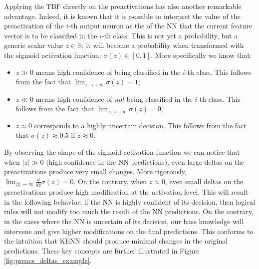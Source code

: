 Applying the TBF directly on the preactivations has also another remarkable advantage. Indeed, it is known that it is  possible to interpret the value of the preactivation of the $i$-th output neuron as the  of the NN that the current feature vector is to be classified in the $i$-th class. This  is not yet a probability, but a generic scalar value $z \in \mathbb{R}$; it will become a probability when transformed with the sigmoid activation function: $\sigma(z) \in \left[0,1\right]$. More specifically we know that:
\begin{itemize}
	\item $z \gg 0$ means high confidence of being classified in the $i$-th class. This follows from the fact that $\lim_{z\rightarrow +\infty} \sigma(z) = 1$;
	\item $z \ll 0$ means high confidence of \textit{not} being classified in the $i$-th class. This follows from the fact that $\lim_{z\rightarrow -\infty} \sigma(z) = 0$;
	\item $z \approx 0$ corresponds to a highly uncertain decision. This follows from the fact that $\sigma(z) \approx 0.5$ if $z \approx 0$.
\end{itemize}



By observing the shape of the sigmoid activation function we can notice that when $|z| \gg 0$ (high confidence in the NN predictions), even large deltas on the preactivations produce very small changes. More rigorously, $\lim_{|z| \rightarrow \infty} \frac{d}{dz} \sigma(z) = 0$. On the contrary, when $z \approx 0$, even small deltas on the preactivations produce high modification at the activation level. 
This will result in the following behavior: if the NN is highly confident of its decision, then logical rules will not modify too much the result of the NN predictions. On the contrary, in the cases where the NN is uncertain of its decision, our base knowledge will intervene and give higher modifications on the final predictions. This conforms to the intuition that KENN should produce minimal changes in the original predictions. These key concepts are further illustrated in Figure \ref{fig:preacs_deltas_example}.

